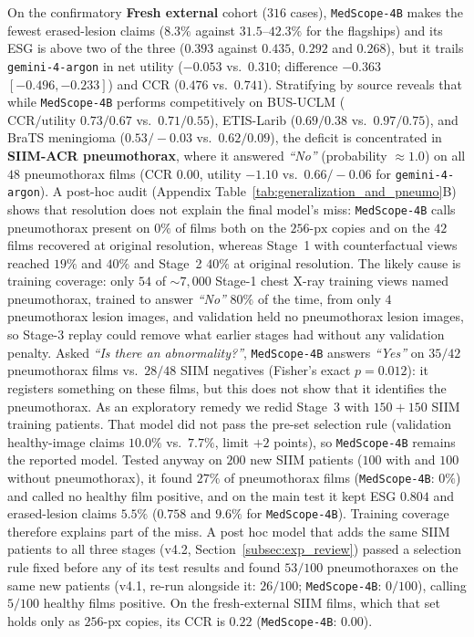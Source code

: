 \documentclass[5p,times,twocolumn,authoryear]{elsarticle}
\begin{document}
On the confirmatory \textbf{Fresh external} cohort ($316$ cases), \texttt{MedScope-4B} makes the fewest erased-lesion claims ($8.3\%$ against $31.5$--$42.3\%$ for the flagships) and its ESG is above two of the three ($0.393$ against $0.435$, $0.292$ and $0.268$), but it trails \texttt{gemini-4-argon} in net utility ($-0.053$ vs.\ $0.310$; difference $-0.363$ $[-0.496, -0.233]$) and CCR ($0.476$ vs.\ $0.741$). Stratifying by source reveals that while \texttt{MedScope-4B} performs competitively on BUS-UCLM ($\text{CCR/utility } 0.73 / 0.67$ vs.\ $0.71 / 0.55$), ETIS-Larib ($0.69 / 0.38$ vs.\ $0.97 / 0.75$), and BraTS meningioma ($0.53 / -0.03$ vs.\ $0.62 / 0.09$), the deficit is concentrated in \textbf{SIIM-ACR pneumothorax}, where it answered \emph{``No''} (probability $\approx 1.0$) on all $48$ pneumothorax films ($\text{CCR } 0.00$, utility $-1.10$ vs.\ $0.66 / -0.06$ for \texttt{gemini-4-argon}). A post-hoc audit (Appendix Table~\ref{tab:generalization_and_pneumo}B) shows that resolution does not explain the final model's miss: \texttt{MedScope-4B} calls pneumothorax present on $0\%$ of films both on the $256\text{-px}$ copies and on the $42$ films recovered at original resolution, whereas Stage~1 with counterfactual views reached $19\%$ and $40\%$ and Stage~2 $40\%$ at original resolution. The likely cause is training coverage: only $54$ of $\sim 7{,}000$ Stage-1 chest X-ray training views named pneumothorax, trained to answer \emph{``No''} $80\%$ of the time, from only $4$ pneumothorax lesion images, and validation held no pneumothorax lesion images, so Stage-3 replay could remove what earlier stages had without any validation penalty. Asked \emph{``Is there an abnormality?''}, \texttt{MedScope-4B} answers \emph{``Yes''} on $35/42$ pneumothorax films vs.\ $28/48$ SIIM negatives (Fisher's exact $p = 0.012$): it registers something on these films, but this does not show that it identifies the pneumothorax. As an exploratory remedy we redid Stage~3 with $150 + 150$ SIIM training patients. That model did not pass the pre-set selection rule (validation healthy-image claims $10.0\%$ vs.\ $7.7\%$, limit $+2$ points), so \texttt{MedScope-4B} remains the reported model. Tested anyway on $200$ new SIIM patients ($100$ with and $100$ without pneumothorax), it found $27\%$ of pneumothorax films (\texttt{MedScope-4B}: $0\%$) and called no healthy film positive, and on the main test it kept ESG $0.804$ and erased-lesion claims $5.5\%$ ($0.758$ and $9.6\%$ for \texttt{MedScope-4B}). Training coverage therefore explains part of the miss. A post hoc model that adds the same SIIM patients to all three stages (v4.2, Section~\ref{subsec:exp_review}) passed a selection rule fixed before any of its test results and found $53/100$ pneumothoraxes on the same new patients (v4.1, re-run alongside it: $26/100$; \texttt{MedScope-4B}: $0/100$), calling $5/100$ healthy films positive. On the fresh-external SIIM films, which that set holds only as $256$-px copies, its CCR is $0.22$ (\texttt{MedScope-4B}: $0.00$).
\end{document}
